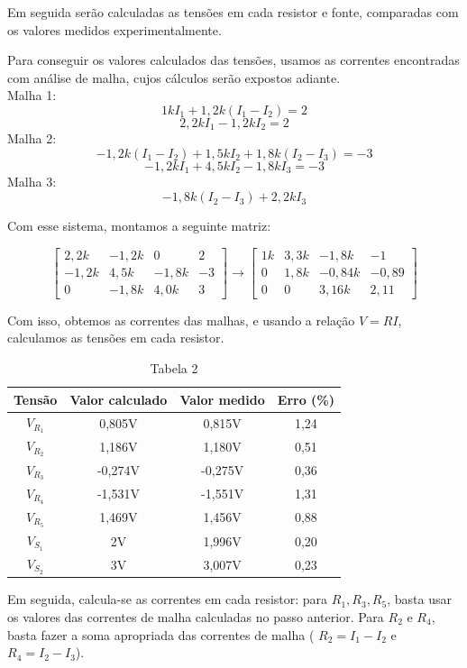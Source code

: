 \documentclass[a4 paper]{article}
\begin{document}
 Em seguida serão calculadas as tensões em cada resistor e fonte, comparadas com os valores medidos experimentalmente.


Para conseguir os valores calculados das tensões, usamos as correntes encontradas com análise de malha, cujos cálculos serão expostos adiante.\\
Malha 1:\\
\[1kI_1+1,2k(I_1-I_2)=2\]
\[2,2kI_1-1,2kI_2=2\]
Malha 2:\\
\[-1,2k(I_1-I_2)+1,5kI_2+1,8k(I_2-I_3)=-3 \]
\[-1,2kI_1+4,5kI_2-1,8kI_3=-3\]
Malha 3:\\
\[-1,8k(I_2-I_3)+2,2kI_3\]

Com esse sistema, montamos a seguinte matriz:

$$
\begin{bmatrix}
2,2k & -1,2k & 0 & 2\\
-1,2k & 4,5k & -1,8k &-3\\
0 & -1,8k & 4,0k &3
\end{bmatrix}
\rightarrow
\begin{bmatrix}
1k & 3,3k & -1,8k & -1\\
0 & 1,8k & -0,84k & -0,89\\
0 & 0 & 3,16k & 2,11
\end{bmatrix}
$$

Com isso, obtemos as correntes das malhas, e usando a relação $V=RI$, calculamos as tensões em cada resistor.


\vspace{5pt}
\begin{table}[h]
\centering
\begin{tabular}{|c|c|c|c|}
\hline
Tensão & Valor calculado & Valor medido & Erro (\%)\\ \hline
$V_{R_1}$ & 0,805V  &  0,815V & 1,24\\\hline 
$V_{R_2}$ & 1,186V  &  1,180V & 0,51\\\hline
$V_{R_3}$ & -0,274V  & -0,275V & 0,36 \\\hline
$V_{R_4}$ & -1,531V  & -1,551V &1,31 \\\hline
$V_{R_5}$ & 1,469V  &  1,456V &0,88 \\\hline
$V_{S_1}$ & 2V &  1,996V & 0,20\\\hline
$V_{S_2}$ & 3V &  3,007V & 0,23\\\hline
\end{tabular}
\caption*{Tabela 2}
\end{table}


\newpage Em seguida, calcula-se as correntes em cada resistor: para $R_1, R_3, R_5$, basta usar os valores das correntes de malha calculadas no passo anterior. Para $R_2$ e $R_4$, basta fazer a soma apropriada das correntes de malha ( $R_2=I_1-I_2$ e $R_4=I_2-I_3$).
\end{document}
